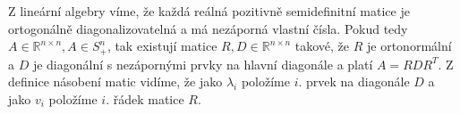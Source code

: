 \documentclass[12pt, a4paper]{article}
\begin{document}
\section{}
Z lineární algebry víme, že každá reálná pozitivně semidefinitní matice je ortogonálně diagonalizovatelná a má nezáporná vlastní čísla. Pokud tedy $A \in \mathbb{R}^{n \times n}, A \in S^n_+$, tak existují matice $R,D \in \mathbb{R}^{n \times n}$ takové, že $R$ je ortonormální a $D$ je diagonální s nezápornými prvky na hlavní diagonále a platí $A = RDR^T$. Z definice násobení matic vidíme, že jako $\lambda_i$ položíme $i$. prvek na diagonále $D$ a jako $v_i$ položíme $i$. řádek matice $R$.

\section{}
\end{document}

